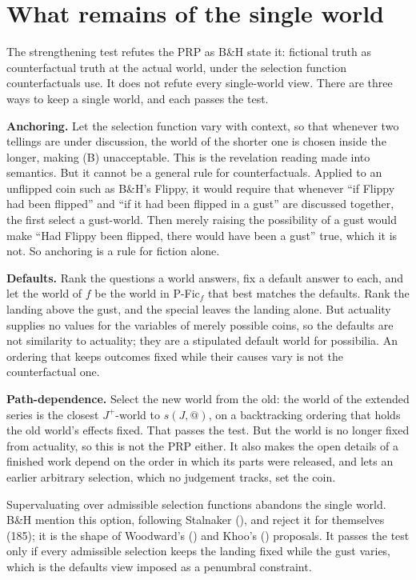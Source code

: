 \documentclass[
  11pt,
  letterpaper,
  DIV=11,
  numbers=noendperiod,
  twoside]{scrartcl}
\begin{document}
\section{What remains of the single world}\label{sec-remains}

The strengthening test refutes the PRP as B\&H state it: fictional truth
as counterfactual truth at the actual world, under the selection
function counterfactuals use. It does not refute every single-world
view. There are three ways to keep a single world, and each passes the
test.

\textbf{Anchoring.} Let the selection function vary with context, so
that whenever two tellings are under discussion, the world of the
shorter one is chosen inside the longer, making (B) unacceptable. This
is the revelation reading made into semantics. But it cannot be a
general rule for counterfactuals. Applied to an unflipped coin such as
B\&H's Flippy, it would require that whenever ``if Flippy had been
flipped'' and ``if it had been flipped in a gust'' are discussed
together, the first select a gust-world. Then merely raising the
possibility of a gust would make ``Had Flippy been flipped, there would
have been a gust'' true, which it is not. So anchoring is a rule for
fiction alone.

\textbf{Defaults.} Rank the questions a world answers, fix a default
answer to each, and let the world of \(f\) be the world in P-Fic\(_f\)
that best matches the defaults. Rank the landing above the gust, and the
special leaves the landing alone. But actuality supplies no values for
the variables of merely possible coins, so the defaults are not
similarity to actuality; they are a stipulated default world for
possibilia. An ordering that keeps outcomes fixed while their causes
vary is not the counterfactual one.

\textbf{Path-dependence.} Select the new world from the old: the world
of the extended series is the closest \(J^{+}\)-world to \(s(J, @)\), on
a backtracking ordering that holds the old world's effects fixed. That
passes the test. But the world is no longer fixed from actuality, so
this is not the PRP either. It also makes the open details of a finished
work depend on the order in which its parts were released, and lets an
earlier arbitrary selection, which no judgement tracks, set the coin.

Supervaluating over admissible selection functions abandons the single
world. B\&H mention this option, following Stalnaker
(), and reject it for themselves
(185); it is the shape of Woodward's ()
and Khoo's () proposals. It passes
the test only if every admissible selection keeps the landing fixed
while the gust varies, which is the defaults view imposed as a penumbral
constraint.
\end{document}
